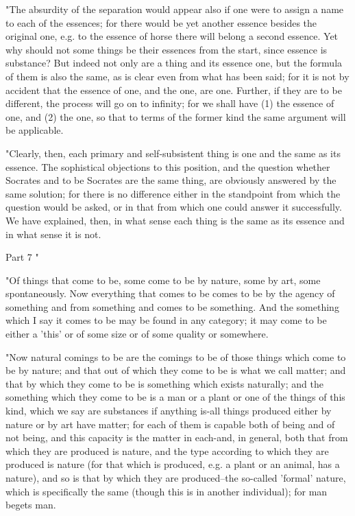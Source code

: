 "The absurdity of the separation would appear also if one were to
assign a name to each of the essences; for there would be yet another
essence besides the original one, e.g. to the essence of horse there
will belong a second essence. Yet why should not some things be their
essences from the start, since essence is substance? But indeed not
only are a thing and its essence one, but the formula of them is also
the same, as is clear even from what has been said; for it is not
by accident that the essence of one, and the one, are one. Further,
if they are to be different, the process will go on to infinity; for
we shall have (1) the essence of one, and (2) the one, so that to
terms of the former kind the same argument will be applicable.

"Clearly, then, each primary and self-subsistent thing is one and
the same as its essence. The sophistical objections to this position,
and the question whether Socrates and to be Socrates are the same
thing, are obviously answered by the same solution; for there is no
difference either in the standpoint from which the question would
be asked, or in that from which one could answer it successfully.
We have explained, then, in what sense each thing is the same as its
essence and in what sense it is not. 

Part 7 "

"Of things that come to be, some come to be by nature, some by art,
some spontaneously. Now everything that comes to be comes to be by
the agency of something and from something and comes to be something.
And the something which I say it comes to be may be found in any category;
it may come to be either a 'this' or of some size or of some quality
or somewhere. 

"Now natural comings to be are the comings to be of those things which
come to be by nature; and that out of which they come to be is what
we call matter; and that by which they come to be is something which
exists naturally; and the something which they come to be is a man
or a plant or one of the things of this kind, which we say are substances
if anything is-all things produced either by nature or by art have
matter; for each of them is capable both of being and of not being,
and this capacity is the matter in each-and, in general, both that
from which they are produced is nature, and the type according to
which they are produced is nature (for that which is produced, e.g.
a plant or an animal, has a nature), and so is that by which they
are produced--the so-called 'formal' nature, which is specifically
the same (though this is in another individual); for man begets man.

